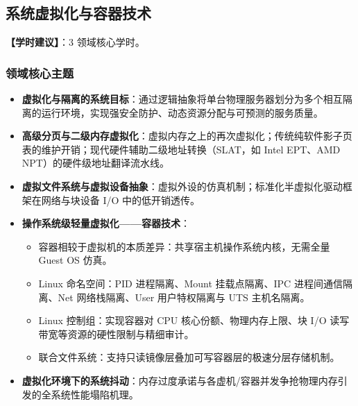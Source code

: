\subsection{系统虚拟化与容器技术}
\textbf{【学时建议】}：3 领域核心学时。

\subsubsection{领域核心主题}
\begin{itemize}\setlength{\itemsep}{0pt}\setlength{\parskip}{0pt}
    \item \textbf{虚拟化与隔离的系统目标}：通过逻辑抽象将单台物理服务器划分为多个相互隔离的运行环境，实现强安全防护、动态资源分配与可预测的服务质量。
    \item \textbf{高级分页与二级内存虚拟化}：虚拟内存之上的再次虚拟化；传统纯软件影子页表的维护开销；现代硬件辅助二级地址转换（SLAT，如 Intel EPT、AMD NPT）的硬件级地址翻译流水线。
    \item \textbf{虚拟文件系统与虚拟设备抽象}：虚拟外设的仿真机制；标准化半虚拟化驱动框架在网络与块设备 I/O 中的低开销透传。
    \item \textbf{操作系统级轻量虚拟化——容器技术}：
    \begin{itemize}\setlength{\itemsep}{0pt}\setlength{\parskip}{0pt}
        \item 容器相较于虚拟机的本质差异：共享宿主机操作系统内核，无需全量 Guest OS 仿真。
        \item Linux 命名空间：PID 进程隔离、Mount 挂载点隔离、IPC 进程间通信隔离、Net 网络栈隔离、User 用户特权隔离与 UTS 主机名隔离。
        \item Linux 控制组：实现容器对 CPU 核心份额、物理内存上限、块 I/O 读写带宽等资源的硬性限制与精细审计。
        \item 联合文件系统：支持只读镜像层叠加可写容器层的极速分层存储机制。
    \end{itemize}
    \item \textbf{虚拟化环境下的系统抖动}：内存过度承诺与各虚机/容器并发争抢物理内存引发的全系统性能塌陷机理。
\end{itemize}

